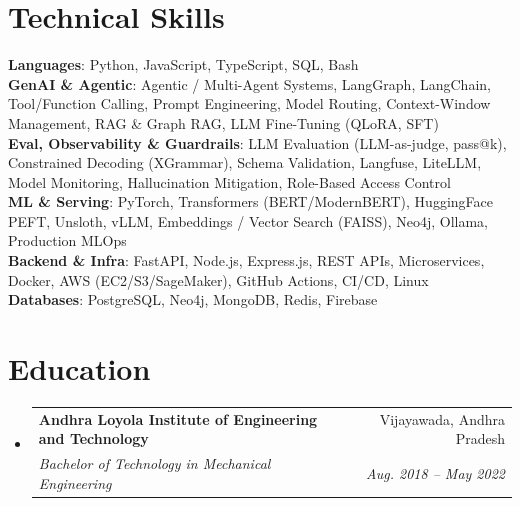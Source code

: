 \documentclass[letterpaper,10pt]{article}
\makeatletter
\newcommand{\resumeSubheading}[4]{
  \vspace{-2pt}\item
    \begin{tabular*}{0.97\textwidth}[t]{l@{\extracolsep{\fill}}r}
      \textbf{#1} & #2 \\
      \textit{\small#3} & \textit{\small #4} \\
    \end{tabular*}\vspace{-7pt}
}
\newcommand{\resumeSubHeadingListStart}{\begin{itemize}[leftmargin=0.15in, label={}]}
\newcommand{\resumeSubHeadingListEnd}{\end{itemize}}
\makeatother
\begin{document}
\section{Technical Skills}
 \begin{itemize}[leftmargin=0.15in, label={}]
    \small{\item{
     \textbf{Languages}{: Python, JavaScript, TypeScript, SQL, Bash} \\ \vspace{2pt}
         \textbf{GenAI \& Agentic}{: Agentic / Multi-Agent Systems, LangGraph, LangChain, Tool/Function Calling, Prompt Engineering, Model Routing, Context-Window Management, RAG \& Graph RAG, LLM Fine-Tuning (QLoRA, SFT)} \\ \vspace{2pt}
     \textbf{Eval, Observability \& Guardrails}{: LLM Evaluation (LLM-as-judge, pass@k), Constrained Decoding (XGrammar), Schema Validation, Langfuse, LiteLLM, Model Monitoring, Hallucination Mitigation, Role-Based Access Control} \\ \vspace{2pt}
     \textbf{ML \& Serving}{: PyTorch, Transformers (BERT/ModernBERT), HuggingFace PEFT, Unsloth, vLLM, Embeddings / Vector Search (FAISS), Neo4j, Ollama, Production MLOps} \\ \vspace{2pt}
     \textbf{Backend \& Infra}{: FastAPI, Node.js, Express.js, REST APIs, Microservices, Docker, AWS (EC2/S3/SageMaker), GitHub Actions, CI/CD, Linux} \\ \vspace{2pt}
     \textbf{Databases}{: PostgreSQL, Neo4j, MongoDB, Redis, Firebase}
    }}
 \end{itemize}

\section{Education}
  \resumeSubHeadingListStart
    \resumeSubheading
      {Andhra Loyola Institute of Engineering and Technology}{Vijayawada, Andhra Pradesh}
      {Bachelor of Technology in Mechanical Engineering}{Aug. 2018 -- May 2022}
  \resumeSubHeadingListEnd

\end{document}
